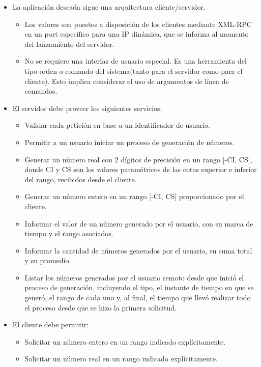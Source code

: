 \documentclass[a4paper,12pt]{article}
\begin{document}
\begin{itemize}
    \item La aplicación deseada sigue una arquitectura cliente/servidor.
    \begin{itemize}
        \item Los valores son puestos a disposición de los clientes mediante XML-RPC en un port específico para una IP dinámica, que se informa al momento del lanzamiento del servidor.
        \item No se requiere una interfaz de usuario especial. Es una herramienta del tipo orden o comando del sistema(tanto para el servidor como para el cliente). Esto implica considerar el uso de argumentos de línea de comandos.
    \end{itemize}
    \item El servidor debe proveer los siguientes servicios:
    \begin{itemize}
        \item Validar cada petición en base a un identificador de usuario.
        \item Permitir a un usuario iniciar un proceso de generación de números.
        \item Generar un número real con 2 dígitos de precisión en un rango [-CI, CS], donde CI y CS son los valores paramétricos de las cotas superior e inferior del rango, recibidos desde el cliente.
        \item Generar un número entero en un rango [-CI, CS] proporcionado por el cliente.
        \item Informar el valor de un número generado por el usuario, con su marca de tiempo y el rango asociados.
        \item Informar la cantidad de números generados por el usuario, su suma total y su promedio.
        \item Listar los números generados por el usuario remoto desde que inició el proceso de generación, incluyendo el tipo, el instante de tiempo en que se generó, el rango de cada uno y, al final, el tiempo que llevó realizar todo el proceso desde que se hizo la primera solicitud.
    \end{itemize}
    \item El cliente debe permitir:
    \begin{itemize}
        \item Solicitar un número entero en un rango indicado explícitamente.
        \item Solicitar un número real en un rango indicado explícitamente.

\end{itemize}
\end{itemize}
\end{document}
